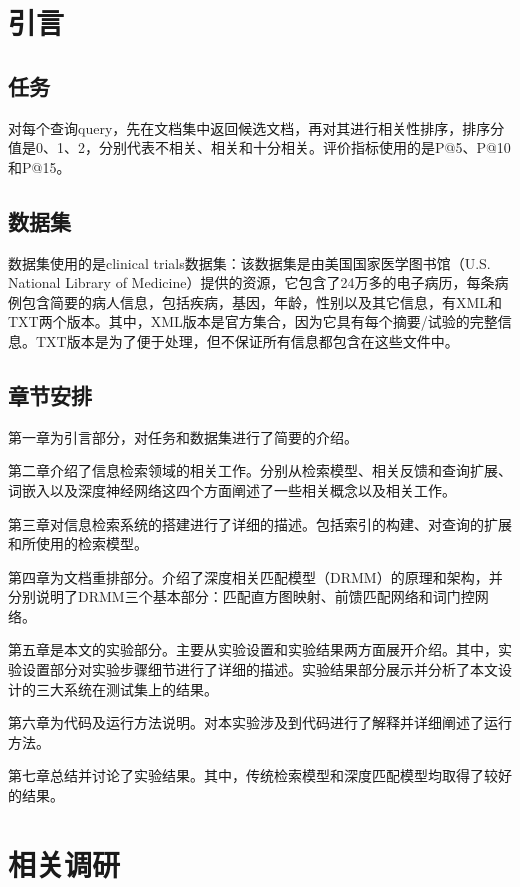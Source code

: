 \documentclass[a4paper]{article}
\begin{document}
\section{引言}

\subsection{任务}
对每个查询query，先在文档集中返回候选文档，再对其进行相关性排序，排序分值是0、1、2，分别代表不相关、相关和十分相关。评价指标使用的是P@5、P@10和P@15。

\subsection{数据集}
数据集使用的是clinical trials数据集：该数据集是由美国国家医学图书馆（U.S. National Library of Medicine）提供的资源，它包含了24万多的电子病历，每条病例包含简要的病人信息，包括疾病，基因，年龄，性别以及其它信息，有XML和TXT两个版本。其中，XML版本是官方集合，因为它具有每个摘要/试验的完整信息。TXT版本是为了便于处理，但不保证所有信息都包含在这些文件中。

\subsection{章节安排}
第一章为引言部分，对任务和数据集进行了简要的介绍。

第二章介绍了信息检索领域的相关工作。分别从检索模型、相关反馈和查询扩展、词嵌入以及深度神经网络这四个方面阐述了一些相关概念以及相关工作。

第三章对信息检索系统的搭建进行了详细的描述。包括索引的构建、对查询的扩展和所使用的检索模型。

第四章为文档重排部分。介绍了深度相关匹配模型（DRMM）的原理和架构，并分别说明了DRMM三个基本部分：匹配直方图映射、前馈匹配网络和词门控网络。

第五章是本文的实验部分。主要从实验设置和实验结果两方面展开介绍。其中，实验设置部分对实验步骤细节进行了详细的描述。实验结果部分展示并分析了本文设计的三大系统在测试集上的结果。

第六章为代码及运行方法说明。对本实验涉及到代码进行了解释并详细阐述了运行方法。

第七章总结并讨论了实验结果。其中，传统检索模型和深度匹配模型均取得了较好的结果。


\pagebreak
\section{相关调研} \label{relatedwork}%
\end{document}
